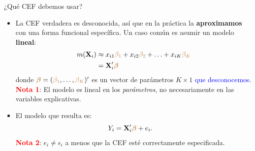 \documentclass[9pt, xcolor=dvipsnames]{beamer}
\begin{document}
\begin{frame}{¿Qué CEF debemos usar?}
    \begin{itemize}
        \item La CEF verdadera es desconocida, así que en la práctica la \textbf{aproximamos} con una forma funcional específica. Un caso común es asumir un modelo \textbf{lineal}:
        \begin{align*}
	\begin{split}
	       m(\textbf{X}_i) &\approx x_{i1}\textcolor{brown}{\beta_1} + x_{i2}\textcolor{brown}{\beta_2} + \ldots + x_{iK}\textcolor{brown}{\beta_K} \\
            &= \textbf{X}'_i \textcolor{brown}{\boldsymbol{\beta}}
	\end{split}
	\end{align*}
        donde \(\textcolor{brown}{\boldsymbol{\beta}} = (\textcolor{brown}{\beta_1}, \ldots, \textcolor{brown}{\beta_K})'\) es un vector de parámetros \(K \times 1\) \textcolor{blue}{que desconocemos}. \\
        \vspace{0.5em}
        \textcolor{red}{\textbf{Nota 1}}: El modelo es lineal en los \textit{parámetros}, no necesariamente en las variables explicativas.
        \vspace{0.5em}
        \item El modelo que resulta es:
        \begin{align*}
	\begin{split}
	       Y_i &= \textbf{X}'_i \textcolor{brown}{\boldsymbol{\beta}} + e_i.
	\end{split}
	\end{align*}
        \textcolor{red}{\textbf{Nota 2}}: \(e_i \neq \epsilon_i\) a menos que la CEF esté correctamente especificada.
    \end{itemize}
\end{frame}
\end{document}
